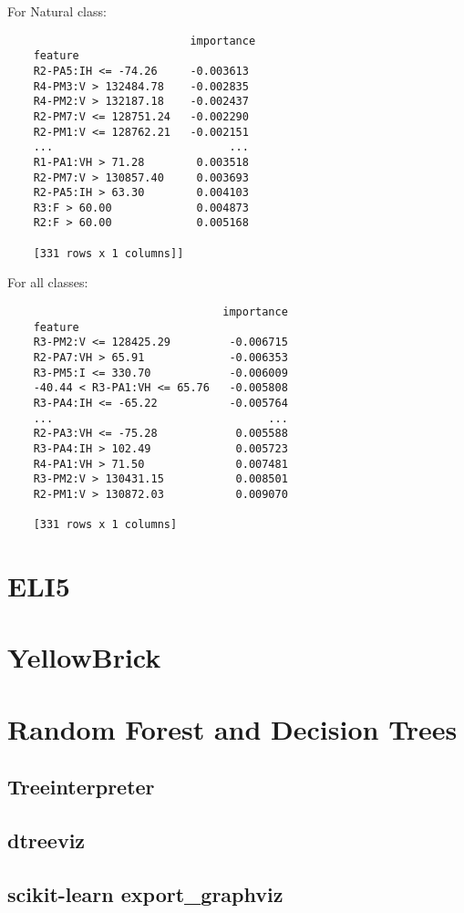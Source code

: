 For Natural class: 
\begin{verbatim}
                            importance
    feature                          
    R2-PA5:IH <= -74.26     -0.003613
    R4-PM3:V > 132484.78    -0.002835
    R4-PM2:V > 132187.18    -0.002437
    R2-PM7:V <= 128751.24   -0.002290
    R2-PM1:V <= 128762.21   -0.002151
    ...                           ...
    R1-PA1:VH > 71.28        0.003518
    R2-PM7:V > 130857.40     0.003693
    R2-PA5:IH > 63.30        0.004103
    R3:F > 60.00             0.004873
    R2:F > 60.00             0.005168
    
    [331 rows x 1 columns]]
\end{verbatim}

For all classes:
\begin{verbatim}
                                 importance
    feature                                
    R3-PM2:V <= 128425.29         -0.006715
    R2-PA7:VH > 65.91             -0.006353
    R3-PM5:I <= 330.70            -0.006009
    -40.44 < R3-PA1:VH <= 65.76   -0.005808
    R3-PA4:IH <= -65.22           -0.005764
    ...                                 ...
    R2-PA3:VH <= -75.28            0.005588
    R3-PA4:IH > 102.49             0.005723
    R4-PA1:VH > 71.50              0.007481
    R3-PM2:V > 130431.15           0.008501
    R2-PM1:V > 130872.03           0.009070
    
    [331 rows x 1 columns]
\end{verbatim}
\section{ELI5}

\section{YellowBrick}

\section{Random Forest and Decision Trees}
\subsection{Treeinterpreter}

\subsection{dtreeviz}

\subsection{scikit-learn export\_graphviz}